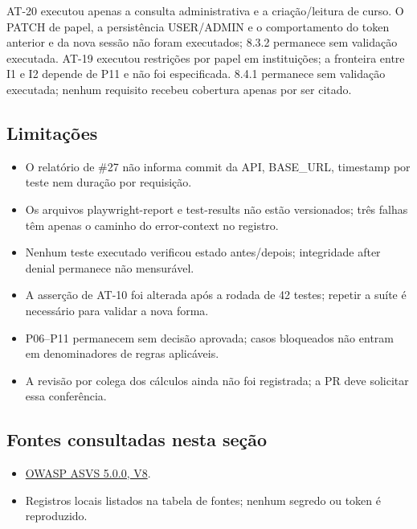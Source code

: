 AT-20 executou apenas a consulta administrativa e a criação/\allowbreak{}leitura de
curso. O PATCH de papel, a persistência USER/\allowbreak{}ADMIN e o comportamento do
token anterior e da nova sessão não foram executados; 8.3.2 permanece
sem validação executada. AT-19 executou restrições por papel em
instituições; a fronteira entre I1 e I2 depende de P11 e não foi
especificada. 8.4.1 permanece sem validação executada; nenhum requisito
recebeu cobertura apenas por ser citado.

\subsection{Limitações}\label{limitauxe7uxf5es}

\begin{itemize}
\tightlist
\item
  O relatório de \#27 não informa commit da API, BASE\_URL, timestamp
  por teste nem duração por requisição.
\item
  Os arquivos playwright-report e test-results não estão versionados;
  três falhas têm apenas o caminho do error-context no registro.
\item
  Nenhum teste executado verificou estado antes/\allowbreak{}depois; integridade
  after denial permanece não mensurável.
\item
  A asserção de AT-10 foi alterada após a rodada de 42 testes; repetir a
  suíte é necessário para validar a nova forma.
\item
  P06--P11 permanecem sem decisão aprovada; casos bloqueados não entram
  em denominadores de regras aplicáveis.
\item
  A revisão por colega dos cálculos ainda não foi registrada; a PR deve
  solicitar essa conferência.
\end{itemize}

\subsection{Fontes consultadas nesta
seção}\label{fontes-consultadas-nesta-seuxe7uxe3o-1}

\begin{itemize}
\tightlist
\item
  \href{https://github.com/OWASP/ASVS/blob/v5.0.0/5.0/en/0x17-V8-Authorization.md}{OWASP
  ASVS 5.0.0, V8}.
\item
  Registros locais listados na tabela de fontes; nenhum segredo ou token
  é reproduzido.
\end{itemize}


